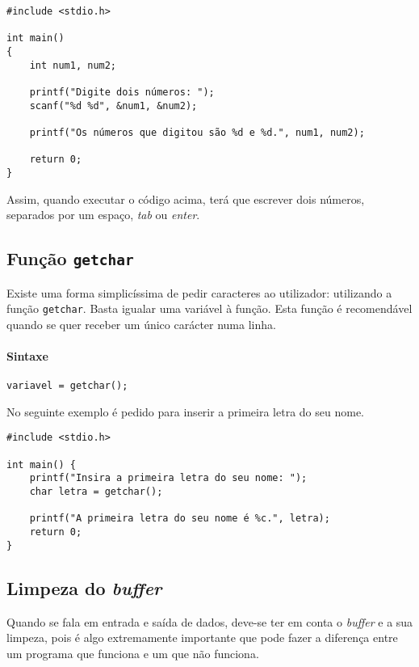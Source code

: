 \begin{lstlisting}
#include <stdio.h>
 
int main()
{   
    int num1, num2;
 
    printf("Digite dois números: ");
    scanf("%d %d", &num1, &num2);
 
    printf("Os números que digitou são %d e %d.", num1, num2);
 
    return 0;
}
\end{lstlisting}

Assim, quando executar o código acima, terá que escrever dois números, separados por um espaço, \textit{tab} ou \textit{enter}.

\subsection{Função \texttt{getchar}}

Existe uma forma simplicíssima de pedir caracteres ao utilizador: utilizando a função \texttt{getchar}. Basta igualar uma variável à função. Esta função é recomendável quando se quer receber um único carácter numa linha.

\paragraph{Sintaxe}

\begin{lstlisting}
variavel = getchar();
\end{lstlisting}

No seguinte exemplo é pedido para inserir a primeira letra do seu nome.

\begin{lstlisting}
#include <stdio.h>
 
int main() {   
    printf("Insira a primeira letra do seu nome: ");
    char letra = getchar();
 
    printf("A primeira letra do seu nome é %c.", letra);
    return 0;
}
\end{lstlisting}

\subsection{Limpeza do \textit{buffer}}

Quando se fala em entrada e saída de dados, deve-se ter em conta o \textit{buffer} e a sua limpeza, pois é algo extremamente importante que pode fazer a diferença entre um programa que funciona e um que não funciona.

